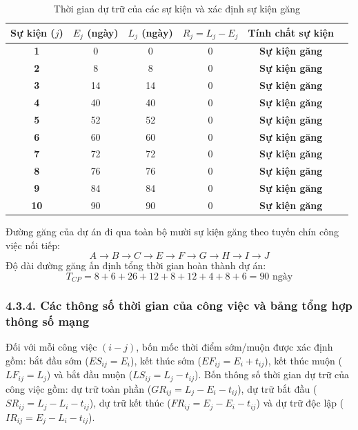 \begin{table}[htbp]
\centering
\caption{Thời gian dự trữ của các sự kiện và xác định sự kiện găng}
\label{tab:du_tru_su_kien}
\begin{tabularx}{0.85\textwidth}{CCCCCY}
\toprule
\textbf{Sự kiện ($j$)} & \textbf{$E_j$ (ngày)} & \textbf{$L_j$ (ngày)} & \textbf{$R_j = L_j - E_j$} & \textbf{Tính chất sự kiện} \\
\midrule
\textbf{1} & 0 & 0 & 0 & \textbf{Sự kiện găng} \\
\textbf{2} & 8 & 8 & 0 & \textbf{Sự kiện găng} \\
\textbf{3} & 14 & 14 & 0 & \textbf{Sự kiện găng} \\
\textbf{4} & 40 & 40 & 0 & \textbf{Sự kiện găng} \\
\textbf{5} & 52 & 52 & 0 & \textbf{Sự kiện găng} \\
\textbf{6} & 60 & 60 & 0 & \textbf{Sự kiện găng} \\
\textbf{7} & 72 & 72 & 0 & \textbf{Sự kiện găng} \\
\textbf{8} & 76 & 76 & 0 & \textbf{Sự kiện găng} \\
\textbf{9} & 84 & 84 & 0 & \textbf{Sự kiện găng} \\
\textbf{10} & 90 & 90 & 0 & \textbf{Sự kiện găng} \\
\bottomrule
\end{tabularx}
\end{table}

Đường găng của dự án đi qua toàn bộ mười sự kiện găng theo tuyến chín công việc nối tiếp:
\[
A \rightarrow B \rightarrow C \rightarrow E \rightarrow F \rightarrow G \rightarrow H \rightarrow I \rightarrow J
\]
Độ dài đường găng ấn định tổng thời gian hoàn thành dự án:
\[
T_{CP} = 8 + 6 + 26 + 12 + 8 + 12 + 4 + 8 + 6 = 90\text{ ngày}
\]

\subsubsection*{4.3.4. Các thông số thời gian của công việc và bảng tổng hợp thông số mạng}

Đối với mỗi công việc $(i - j)$, bốn mốc thời điểm sớm/muộn được xác định gồm: bắt đầu sớm ($ES_{ij} = E_i$), kết thúc sớm ($EF_{ij} = E_i + t_{ij}$), kết thúc muộn ($LF_{ij} = L_j$) và bắt đầu muộn ($LS_{ij} = L_j - t_{ij}$). Bốn thông số thời gian dự trữ của công việc gồm: dự trữ toàn phần ($GR_{ij} = L_j - E_i - t_{ij}$), dự trữ bắt đầu ($SR_{ij} = L_j - L_i - t_{ij}$), dự trữ kết thúc ($FR_{ij} = E_j - E_i - t_{ij}$) và dự trữ độc lập ($IR_{ij} = E_j - L_i - t_{ij}$).

